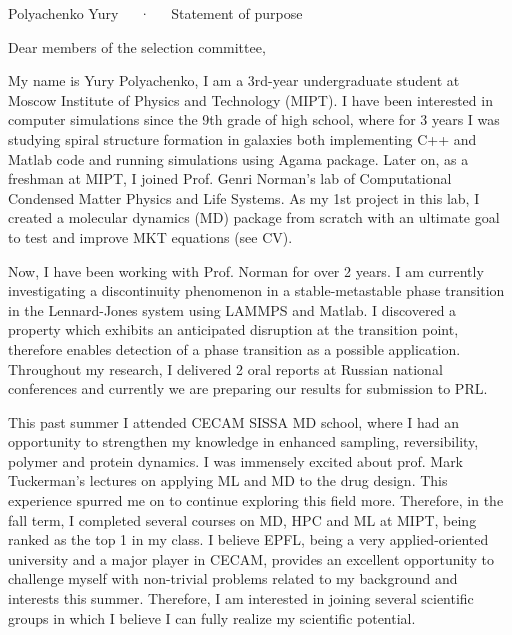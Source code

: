 \documentclass[12pt, a4paper]{awesome-cv}
\begin{document}
\makecvheader[C]

\makecvfooter
  {\thepage}
  {Polyachenko Yury~~~·~~~Statement of purpose}
  {\thepage}

\vspace{25pt}
\hspace{5pt} Dear members of the selection committee, 

\begin{cvletter}


My name is Yury Polyachenko, I am a 3rd-year undergraduate student at Moscow Institute of Physics and Technology (MIPT). I have been interested in computer simulations since the 9th grade of high school, where for 3 years I was studying spiral structure formation in galaxies both implementing C++ and Matlab code and running simulations using Agama package. Later on, as a freshman at MIPT, I joined Prof. Genri Norman’s lab of Computational Condensed Matter Physics and Life Systems. As my 1st project in this lab, I created a molecular dynamics (MD) package from scratch with an ultimate goal to test and improve MKT equations (see CV). 

Now, I have been working with Prof. Norman for over 2 years. I am currently investigating a discontinuity phenomenon in a stable-metastable phase transition in the Lennard-Jones system using LAMMPS and Matlab. I discovered a property which exhibits an anticipated disruption at the transition point, therefore enables detection of a phase transition as a possible application. Throughout my research, I delivered 2 oral reports at Russian national conferences and currently we are preparing our results for submission to PRL.

This past summer I attended CECAM SISSA MD school, where I had an opportunity to strengthen my knowledge in enhanced sampling, reversibility, polymer and protein dynamics. I was immensely excited about prof. Mark Tuckerman's lectures on applying ML and MD to the drug design. This experience spurred me on to continue exploring this field more. Therefore, in the fall term, I completed several courses on MD, HPC and ML at MIPT, being ranked as the top 1 in my class. I believe EPFL, being a very applied-oriented university and a major player in CECAM, provides an excellent opportunity to challenge myself with non-trivial problems related to my background and interests this summer. Therefore, I am interested in joining several scientific groups in which I believe I can fully realize my scientific potential.


\end{cvletter}
\end{document}
